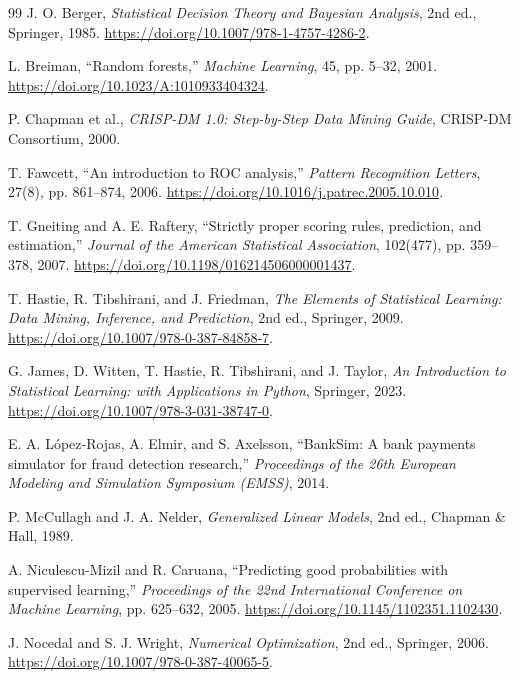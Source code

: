 \documentclass[11pt,a4paper]{article}
\begin{document}
\begin{thebibliography}{99}
\setlength{\itemsep}{4pt}
J. O. Berger, \emph{Statistical Decision Theory and Bayesian Analysis},
2nd ed., Springer, 1985.
\url{https://doi.org/10.1007/978-1-4757-4286-2}.

L. Breiman, ``Random forests,'' \emph{Machine Learning},
45, pp. 5--32, 2001.
\url{https://doi.org/10.1023/A:1010933404324}.

P. Chapman et al., \emph{CRISP-DM 1.0: Step-by-Step Data Mining Guide},
CRISP-DM Consortium, 2000.

T. Fawcett, ``An introduction to ROC analysis,''
\emph{Pattern Recognition Letters}, 27(8), pp. 861--874, 2006.
\url{https://doi.org/10.1016/j.patrec.2005.10.010}.

T. Gneiting and A. E. Raftery, ``Strictly proper scoring rules,
prediction, and estimation,'' \emph{Journal of the American Statistical Association},
102(477), pp. 359--378, 2007.
\url{https://doi.org/10.1198/016214506000001437}.

T. Hastie, R. Tibshirani, and J. Friedman,
\emph{The Elements of Statistical Learning: Data Mining, Inference, and Prediction},
2nd ed., Springer, 2009.
\url{https://doi.org/10.1007/978-0-387-84858-7}.

G. James, D. Witten, T. Hastie, R. Tibshirani, and J. Taylor,
\emph{An Introduction to Statistical Learning: with Applications in Python},
Springer, 2023.
\url{https://doi.org/10.1007/978-3-031-38747-0}.

E. A. L\'opez-Rojas, A. Elmir, and S. Axelsson,
``BankSim: A bank payments simulator for fraud detection research,''
\emph{Proceedings of the 26th European Modeling and Simulation Symposium
(EMSS)}, 2014.

P. McCullagh and J. A. Nelder, \emph{Generalized Linear Models},
2nd ed., Chapman \& Hall, 1989.

A. Niculescu-Mizil and R. Caruana,
``Predicting good probabilities with supervised learning,''
\emph{Proceedings of the 22nd International Conference on Machine Learning},
pp. 625--632, 2005.
\url{https://doi.org/10.1145/1102351.1102430}.

J. Nocedal and S. J. Wright, \emph{Numerical Optimization},
2nd ed., Springer, 2006.
\url{https://doi.org/10.1007/978-0-387-40065-5}.


\end{thebibliography}
\end{document}

